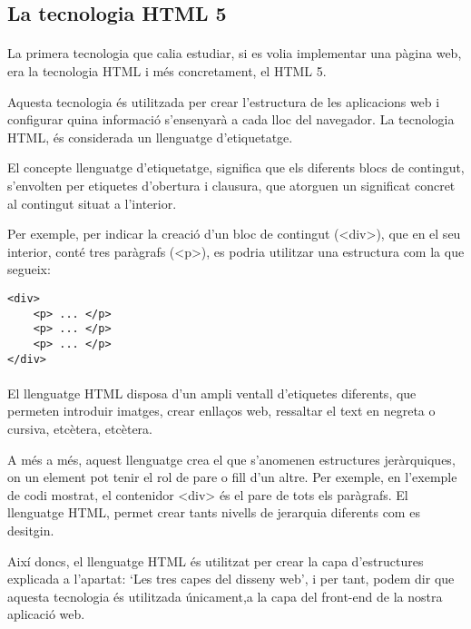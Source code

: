 \subsection{La tecnologia HTML 5}

    \paragraph{}
    La primera tecnologia que calia estudiar, si es volia implementar una pàgina web, era la tecnologia HTML i més concretament, el HTML 5.

    Aquesta tecnologia és utilitzada per crear l’estructura de les aplicacions web i configurar quina informació s’ensenyarà a cada lloc del navegador. La tecnologia HTML, és considerada un llenguatge d’etiquetatge.

    El concepte llenguatge d'etiquetatge, significa que els diferents blocs de contingut, s'envolten per etiquetes d'obertura i clausura, que atorguen un significat concret al contingut situat a l'interior.

    Per exemple, per indicar la creació d’un bloc de contingut (<div>), que en el seu interior, conté tres paràgrafs (<p>), es podria utilitzar una estructura com la que segueix:

    \begin{lstlisting}[style=rawOwn,caption={Bloc de contingunts HTML amb tres paràgrafs}]
<div>
    <p> ... </p>
    <p> ... </p>
    <p> ... </p>
</div>
    \end{lstlisting}

    \paragraph{}
    El llenguatge HTML disposa d’un ampli ventall d’etiquetes diferents, que permeten introduir imatges, crear enllaços web, ressaltar el text en negreta o cursiva, etcètera, etcètera.

    A més a més, aquest llenguatge crea el que s’anomenen estructures jeràrquiques, on un element pot tenir el rol de pare o fill d’un altre. Per exemple, en l’exemple de codi mostrat, el contenidor <div> és el pare de tots els paràgrafs. El llenguatge HTML, permet crear tants nivells de jerarquia diferents com es desitgin.

    Així doncs, el llenguatge HTML és utilitzat per crear la capa d'estructures explicada a l'apartat: `Les tres capes del disseny web', i per tant, podem dir que aquesta tecnologia és utilitzada únicament,a la capa del front-end de la nostra aplicació web.
